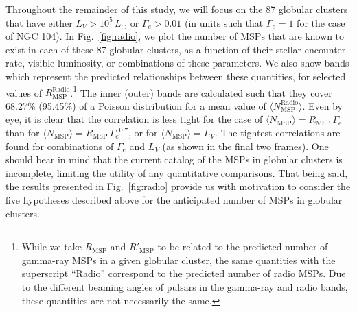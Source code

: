 Throughout the remainder of this study, we will focus on the 87 globular clusters that have either $L_V > 10^5 \, L_{\odot}$ or $\Gamma_e > 0.01$ (in units such that $\Gamma_e =1$ for the case of NGC 104). In Fig.~\ref{fig:radio}, we plot the number of MSPs that are known to exist in each of these 87 globular clusters, as a function of their stellar encounter rate, visible luminosity, or combinations of these parameters. We also show bands which represent the predicted relationships between these quantities, for selected values of $R_\textrm{MSP}^\textrm{Radio}$.\footnote{While we take $R_\textrm{MSP}$ and $R'_\textrm{MSP}$ to be related to the predicted number of gamma-ray MSPs in a given globular cluster, the same quantities with the superscript ``Radio'' correspond to the predicted number of radio MSPs. Due to the different beaming angles of pulsars in the gamma-ray and radio bands, these quantities are not necessarily the same.} 
The inner (outer) bands are calculated such that they cover 68.27\% (95.45\%) of a Poisson distribution for a mean value of $\langle N_\textrm{MSP}^\textrm{Radio} \rangle$. Even by eye, it is clear that the correlation is less tight for the case of $\langle N_\textrm{MSP} \rangle = R_\textrm{MSP}\,{\Gamma_e}$ than for $\langle N_\textrm{MSP} \rangle = R_\textrm{MSP}\,{\Gamma_e}^{0.7}$, or for $\langle N_\textrm{MSP} \rangle = L_V$. The tightest correlations are found for combinations of $\Gamma_e$ and $L_V$ (as shown in the final two frames). One should bear in mind that the current catalog of the MSPs in globular clusters is incomplete, limiting the utility of any quantitative comparisons. That being said, the results presented in Fig.~\ref{fig:radio} provide us with motivation to consider the five hypotheses described above for the anticipated number of MSPs in globular clusters.

